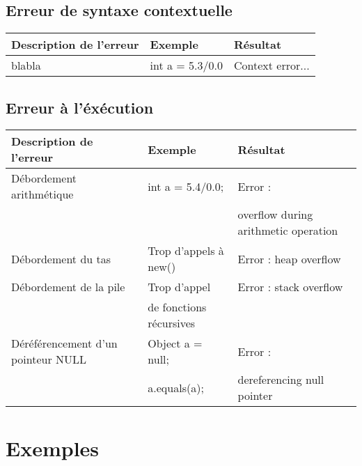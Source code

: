 \documentclass[a4,12pt]{article}
\begin{document}
\subsection{Erreur de syntaxe contextuelle}
\begin{tabular}{|l|l|l|}
\hline
   Description de l'erreur & Exemple & Résultat \\
   \hline
   blabla & int a = 5.3/0.0 & Context error...  \\
   \hline
\end{tabular}
\subsection{Erreur à l'éxécution}

\begin{tabular}{|l|l|l|}
\hline
   Description de l'erreur & Exemple & Résultat \\
   \hline
   Débordement arithmétique & int a = 5.4/0.0; & Error :  \\
      &  & overflow during arithmetic operation \\
   \hline
   Débordement du tas & Trop d'appels à new() & Error : heap overflow \\
   \hline
   Débordement de la pile & Trop d'appel& Error : stack overflow \\
         & de fonctions récursives &\\
   
   \hline
   Déréférencement d'un pointeur NULL & Object a = null;  & Error :  \\
   & a.equals(a); & dereferencing null pointer \\
   \hline
\end{tabular}



\section{Exemples}
\end{document}
